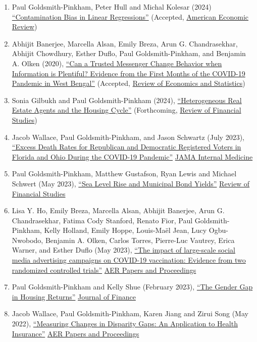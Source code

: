\documentclass[letterpaper]{article}
\begin{document}
\begin{enumerate}
  \item Paul Goldsmith-Pinkham, Peter Hull and Michal Kolesar (2024) \href{https://arxiv.org/abs/2106.05024}{``Contamination Bias in Linear Regressions''} (Accepted, \ul{American Economic Review})
  \item Abhijit Banerjee, Marcella Alsan, Emily Breza, Arun G. Chandrasekhar, Abhijit Chowdhury, Esther Duflo, Paul Goldsmith-Pinkham, and Benjamin A. Olken (2020), \href{https://economics.mit.edu/sites/default/files/2022-08/wb_manuscript_final.pdf}{``Can a Trusted Messenger Change Behavior when Information is Plentiful? Evidence from the First Months of the COVID-19 Pandemic in West Bengal''}  (Accepted, \ul{Review of Economics and Statistics})
  \item Sonia Gilbukh and Paul Goldsmith-Pinkham (2024), \href{http://paulgp.github.io/papers/Heterogeneous_Real_Estate_Agents_and_the_Housing_Cycle.pdf}{``Heterogeneous Real Estate Agents and the Housing Cycle''} (Forthcoming, \ul{Review of Financial Studies})
\item Jacob Wallace, Paul Goldsmith-Pinkham, and Jason Schwartz (July 2023), \href{https://jamanetwork.com/journals/jamainternalmedicine/fullarticle/2807617}{``Excess Death Rates for Republican and Democratic Registered Voters in Florida and Ohio During the COVID-19 Pandemic''} \ul{JAMA Internal Medicine}
\item Paul Goldsmith-Pinkham, Matthew Gustafson, Ryan Lewis and Michael Schwert (May 2023), \href{http://paulgp.github.io/papers/ggls_munis.pdf}{``Sea Level Rise and Municipal Bond Yields''} \ul{Review of Financial Studies}
\item Lisa Y. Ho, Emily Breza, Marcella Alsan, Abhijit Banerjee, Arun G. Chandrasekhar, Fatima Cody Stanford, Renato Fior, Paul Goldsmith-Pinkham, Kelly Holland, Emily Hoppe, Louis-Maël Jean, Lucy Ogbu-Nwobodo, Benjamin A. Olken, Carlos Torres, Pierre-Luc Vautrey, Erica Warner, and Esther Duflo (May 2023), \href{https://paulgp.github.io/papers/submission_manuscript_appendix_social_media_covid_vaccines.pdf}{``The impact of large-scale social media advertising campaigns on COVID-19 vaccination: Evidence from two randomized controlled trials''} \ul{AER Papers and Proceedings}
\item Paul Goldsmith-Pinkham and Kelly Shue (February 2023), \href{https://paulgp.github.io/papers/Gender_Gap_in_Housing_Returns.pdf}{``The Gender Gap in Housing Returns''} \ul{Journal of Finance}
\item  Jacob Wallace, Paul Goldsmith-Pinkham, Karen Jiang and Zirui Song (May 2022), \href{https://paulgp.github.io/papers/aerpp_medicare.pdf}{``Measuring Changes in Disparity Gaps: An Application to Health Insurance''} \ul{AER Papers and Proceedings}

\end{enumerate}
\end{document}
